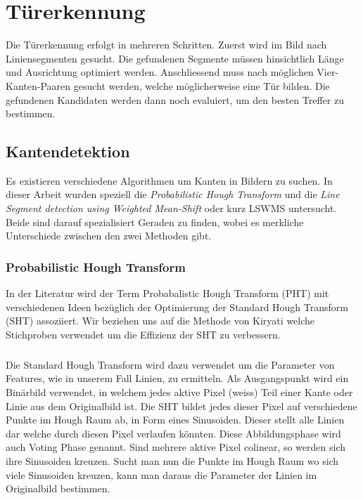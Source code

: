 \chapter{Türerkennung}

Die Türerkennung erfolgt in mehreren Schritten. Zuerst wird im Bild nach Liniensegmenten gesucht. Die gefundenen Segmente müssen hinsichtlich Länge und Ausrichtung optimiert werden. Anschliessend muss nach möglichen Vier-Kanten-Paaren gesucht werden, welche möglicherweise eine Tür bilden. Die gefundenen Kandidaten werden dann noch evaluiert, um den besten Treffer zu bestimmen.

\section{Kantendetektion}

Es existieren verschiedene Algorithmen um Kanten in Bildern zu suchen. In dieser Arbeit wurden speziell die \textit{Probabilistic Hough Transform} und die \textit{Line Segment detection using Weighted Mean-Shift} oder kurz LSWMS untersucht. Beide sind darauf spezialisiert Geraden zu finden, wobei es merkliche Unterschiede zwischen den zwei Methoden gibt.

\subsection{Probabilistic Hough Transform}

In der Literatur wird der Term Probabalistic Hough Transform (PHT) mit verschiedenen Ideen bezüglich der Optimierung der Standard Hough Transform (SHT) assoziiert. Wir beziehen uns auf die Methode von Kiryati \cite{kiryati} welche Stichproben verwendet um die Effizienz der SHT zu verbessern.
\paragraph{}
Die Standard Hough Transform wird dazu verwendet um die Parameter von Features, wie in unserem Fall Linien, zu ermitteln. Als Ausgangspunkt wird ein Binärbild verwendet, in welchem jedes aktive Pixel (weiss) Teil einer Kante oder Linie aus dem Originalbild ist. Die SHT bildet jedes dieser Pixel auf verschiedene Punkte im Hough Raum ab, in Form eines Sinusoiden. Dieser stellt alle Linien dar welche durch diesen Pixel verlaufen könnten. Diese Abbildungsphase wird auch Voting Phase genannt. Sind mehrere aktive Pixel colinear, so werden sich ihre Sinusoiden kreuzen. Sucht man nun die Punkte im Hough Raum wo sich viele Sinusoiden kreuzen, kann man daraus die Parameter der Linien im Originalbild bestimmen.
